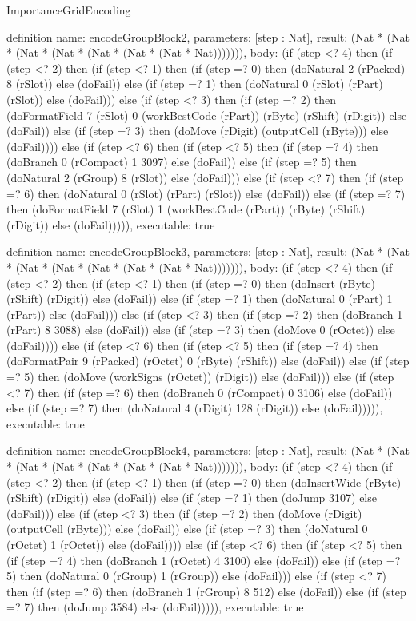 \begin{lexlean}{ImportanceGridEncoding}
\begin{semanticmodule}
definition{
  name: encodeGroupBlock2,
  parameters: [step : Nat],
  result: (Nat * (Nat * (Nat * (Nat * (Nat * (Nat * (Nat * Nat))))))),
  body: (if (step <? 4) then
      (if (step <? 2) then
      (if (step <? 1) then
      (if (step =? 0) then (doNatural 2 (rPacked) 8 (rSlot)) else (doFail)) else
      (if (step =? 1) then (doNatural 0 (rSlot) (rPart) (rSlot)) else (doFail))) else
      (if (step <? 3) then
      (if (step =? 2) then (doFormatField 7 (rSlot) 0 (workBestCode (rPart)) (rByte) (rShift) (rDigit)) else (doFail)) else
      (if (step =? 3) then (doMove (rDigit) (outputCell (rByte))) else (doFail)))) else
      (if (step <? 6) then
      (if (step <? 5) then
      (if (step =? 4) then (doBranch 0 (rCompact) 1 3097) else (doFail)) else
      (if (step =? 5) then (doNatural 2 (rGroup) 8 (rSlot)) else (doFail))) else
      (if (step <? 7) then
      (if (step =? 6) then (doNatural 0 (rSlot) (rPart) (rSlot)) else (doFail)) else
      (if (step =? 7) then (doFormatField 7 (rSlot) 1 (workBestCode (rPart)) (rByte) (rShift) (rDigit)) else (doFail))))),
  executable: true
}

definition{
  name: encodeGroupBlock3,
  parameters: [step : Nat],
  result: (Nat * (Nat * (Nat * (Nat * (Nat * (Nat * (Nat * Nat))))))),
  body: (if (step <? 4) then
      (if (step <? 2) then
      (if (step <? 1) then
      (if (step =? 0) then (doInsert (rByte) (rShift) (rDigit)) else (doFail)) else
      (if (step =? 1) then (doNatural 0 (rPart) 1 (rPart)) else (doFail))) else
      (if (step <? 3) then
      (if (step =? 2) then (doBranch 1 (rPart) 8 3088) else (doFail)) else
      (if (step =? 3) then (doMove 0 (rOctet)) else (doFail)))) else
      (if (step <? 6) then
      (if (step <? 5) then
      (if (step =? 4) then (doFormatPair 9 (rPacked) (rOctet) 0 (rByte) (rShift)) else (doFail)) else
      (if (step =? 5) then (doMove (workSigns (rOctet)) (rDigit)) else (doFail))) else
      (if (step <? 7) then
      (if (step =? 6) then (doBranch 0 (rCompact) 0 3106) else (doFail)) else
      (if (step =? 7) then (doNatural 4 (rDigit) 128 (rDigit)) else (doFail))))),
  executable: true
}

definition{
  name: encodeGroupBlock4,
  parameters: [step : Nat],
  result: (Nat * (Nat * (Nat * (Nat * (Nat * (Nat * (Nat * Nat))))))),
  body: (if (step <? 4) then
      (if (step <? 2) then
      (if (step <? 1) then
      (if (step =? 0) then (doInsertWide (rByte) (rShift) (rDigit)) else (doFail)) else
      (if (step =? 1) then (doJump 3107) else (doFail))) else
      (if (step <? 3) then
      (if (step =? 2) then (doMove (rDigit) (outputCell (rByte))) else (doFail)) else
      (if (step =? 3) then (doNatural 0 (rOctet) 1 (rOctet)) else (doFail)))) else
      (if (step <? 6) then
      (if (step <? 5) then
      (if (step =? 4) then (doBranch 1 (rOctet) 4 3100) else (doFail)) else
      (if (step =? 5) then (doNatural 0 (rGroup) 1 (rGroup)) else (doFail))) else
      (if (step <? 7) then
      (if (step =? 6) then (doBranch 1 (rGroup) 8 512) else (doFail)) else
      (if (step =? 7) then (doJump 3584) else (doFail))))),
  executable: true
}


\end{semanticmodule}
\end{lexlean}
